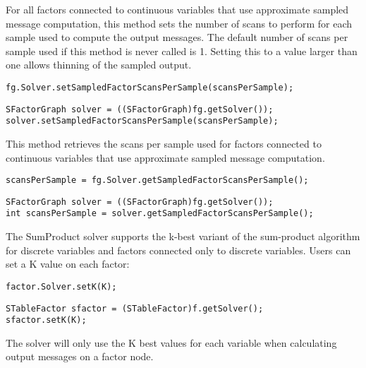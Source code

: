 
For all factors connected to continuous variables that use approximate sampled message computation, this method sets the number of scans to perform for each sample used to compute the output messages.  The default number of scans per sample used if this method is never called is 1.  Setting this to a value larger than one allows thinning of the sampled output.

\ifmatlab
\begin{lstlisting}
fg.Solver.setSampledFactorScansPerSample(scansPerSample);
\end{lstlisting}
\fi

\ifjava
\begin{lstlisting}
SFactorGraph solver = ((SFactorGraph)fg.getSolver());
solver.setSampledFactorScansPerSample(scansPerSample);
\end{lstlisting}
\fi


This method retrieves the scans per sample used for factors connected to continuous variables that use approximate sampled message computation.

\ifmatlab
\begin{lstlisting}
scansPerSample = fg.Solver.getSampledFactorScansPerSample();
\end{lstlisting}
\fi

\ifjava
\begin{lstlisting}
SFactorGraph solver = ((SFactorGraph)fg.getSolver());
int scansPerSample = solver.getSampledFactorScansPerSample();
\end{lstlisting}
\fi




The SumProduct solver supports the k-best variant of the sum-product algorithm for discrete variables and factors connected only to discrete variables.  Users can set a K value on each factor:

\ifmatlab
\begin{lstlisting}
factor.Solver.setK(K);
\end{lstlisting}
\fi

\ifjava
\begin{lstlisting}
STableFactor sfactor = (STableFactor)f.getSolver();
sfactor.setK(K);
\end{lstlisting}
\fi


The solver will only use the K best values for each variable when calculating output messages on a factor node.

